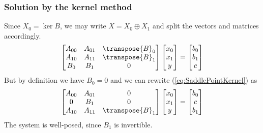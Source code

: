 \subsubsection{Solution by the kernel method}
%
Since $X_0=\ker B$, we may write $X= X_0\oplus X_1$ and split the vectors and matrices accordingly.
%
\begin{equation}\label{eq:SaddlePointKernel}
\begin{bmatrix}
A_{00} & A_{01} & \transpose{B}_0\\
A_{10} & A_{11} & \transpose{B}_1\\
B_0 & B_1 & 0
\end{bmatrix}
\begin{bmatrix}
x_0\\x_1\\y
\end{bmatrix}
=
\begin{bmatrix}
b_0\\b_1\\c
\end{bmatrix}
\end{equation}
%
But by definition we have $B_0=0$ and we can rewrite (\ref{eq:SaddlePointKernel}) as
%
\begin{equation}\label{eq:SaddlePointKernel}
\begin{bmatrix}
A_{00} & A_{01} & 0\\
0 & B_1 & 0\\
A_{10} & A_{11} & \transpose{B}_1\\
\end{bmatrix}
\begin{bmatrix}
x_0\\x_1\\y
\end{bmatrix}
=
\begin{bmatrix}
b_0\\c\\b_1
\end{bmatrix}
\end{equation}
%
The system is well-posed, since $B_1$ is invertible.
%
%
